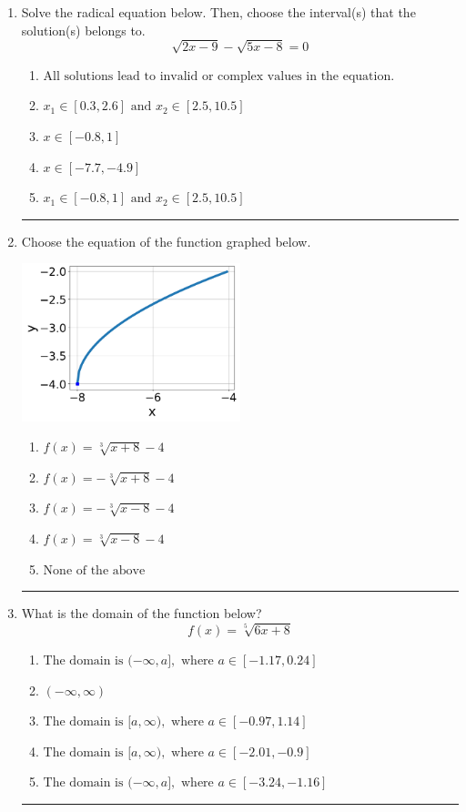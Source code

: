 \documentclass[14pt]{extbook}
\newcommand{\litem}[1]{\item#1\hspace*{-1cm}\rule{\textwidth}{0.4pt}}
\begin{document}
\begin{enumerate}
{\begin{enumerate}[label=\Alph*.]
\end{enumerate} }
\litem{
Solve the radical equation below. Then, choose the interval(s) that the solution(s) belongs to.\[ \sqrt{2 x - 9} - \sqrt{5 x - 8} = 0 \]\begin{enumerate}[label=\Alph*.]
\item \( \text{All solutions lead to invalid or complex values in the equation.} \)
\item \( x_1 \in [0.3, 2.6] \text{ and } x_2 \in [2.5,10.5] \)
\item \( x \in [-0.8,1] \)
\item \( x \in [-7.7,-4.9] \)
\item \( x_1 \in [-0.8, 1] \text{ and } x_2 \in [2.5,10.5] \)

\end{enumerate} }
\litem{
Choose the equation of the function graphed below.
\begin{center}
    \includegraphics[width=0.5\textwidth]{../Figures/radicalGraphToEquationA.png}
\end{center}
\begin{enumerate}[label=\Alph*.]
\item \( f(x) = \sqrt[3]{x + 8} - 4 \)
\item \( f(x) = - \sqrt[3]{x + 8} - 4 \)
\item \( f(x) = - \sqrt[3]{x - 8} - 4 \)
\item \( f(x) = \sqrt[3]{x - 8} - 4 \)
\item \( \text{None of the above} \)

\end{enumerate} }
\litem{
What is the domain of the function below?\[ f(x) = \sqrt[5]{6 x + 8} \]\begin{enumerate}[label=\Alph*.]
\item \( \text{The domain is } (-\infty, a], \text{   where } a \in [-1.17, 0.24] \)
\item \( (-\infty, \infty) \)
\item \( \text{The domain is } [a, \infty), \text{   where } a \in [-0.97, 1.14] \)
\item \( \text{The domain is } [a, \infty), \text{   where } a \in [-2.01, -0.9] \)
\item \( \text{The domain is } (-\infty, a], \text{   where } a \in [-3.24, -1.16] \)


\end{enumerate}}
\end{enumerate}
\end{document}
